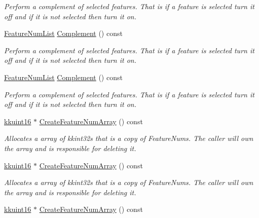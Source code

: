 \begin{DoxyCompactItemize}
\begin{DoxyCompactList}\small\item\em Perform a complement of selected features. That is if a feature is selected turn it off and if it is not selected then turn it on. \end{DoxyCompactList}\item 
\hyperlink{class_k_k_m_l_l_1_1_feature_num_list}{Feature\+Num\+List} \hyperlink{class_k_k_m_l_l_1_1_feature_num_list_a5f0a4c63e513676a77543e62d96feaf0}{Complement} () const 
\begin{DoxyCompactList}\small\item\em Perform a complement of selected features. That is if a feature is selected turn it off and if it is not selected then turn it on. \end{DoxyCompactList}\item 
\hyperlink{class_k_k_m_l_l_1_1_feature_num_list}{Feature\+Num\+List} \hyperlink{class_k_k_m_l_l_1_1_feature_num_list_a14512fe30f9e99df084457a6f6e94d76}{Complement} () const 
\begin{DoxyCompactList}\small\item\em Perform a complement of selected features. That is if a feature is selected turn it off and if it is not selected then turn it on. \end{DoxyCompactList}\item 
\hyperlink{namespace_k_k_b_aa8c7d4d30381c8a0b6fce68974a9c8a9}{kkuint16} $\ast$ \hyperlink{class_k_k_m_l_l_1_1_feature_num_list_aeab7389cf62007139c30194b8cda863e}{Create\+Feature\+Num\+Array} () const 
\begin{DoxyCompactList}\small\item\em Allocates a array of kkint32\textquotesingle{}s that is a copy of Feature\+Nums. The caller will own the array and is responsible for deleting it. \end{DoxyCompactList}\item 
\hyperlink{namespace_k_k_b_aa8c7d4d30381c8a0b6fce68974a9c8a9}{kkuint16} $\ast$ \hyperlink{class_k_k_m_l_l_1_1_feature_num_list_a149a676970b2914d77351454002508f5}{Create\+Feature\+Num\+Array} () const 
\begin{DoxyCompactList}\small\item\em Allocates a array of kkint32\textquotesingle{}s that is a copy of Feature\+Nums. The caller will own the array and is responsible for deleting it. \end{DoxyCompactList}\item 
\hyperlink{namespace_k_k_b_aa8c7d4d30381c8a0b6fce68974a9c8a9}{kkuint16} $\ast$ \hyperlink{class_k_k_m_l_l_1_1_feature_num_list_aeab7389cf62007139c30194b8cda863e}{Create\+Feature\+Num\+Array} () const 

\end{DoxyCompactItemize}
